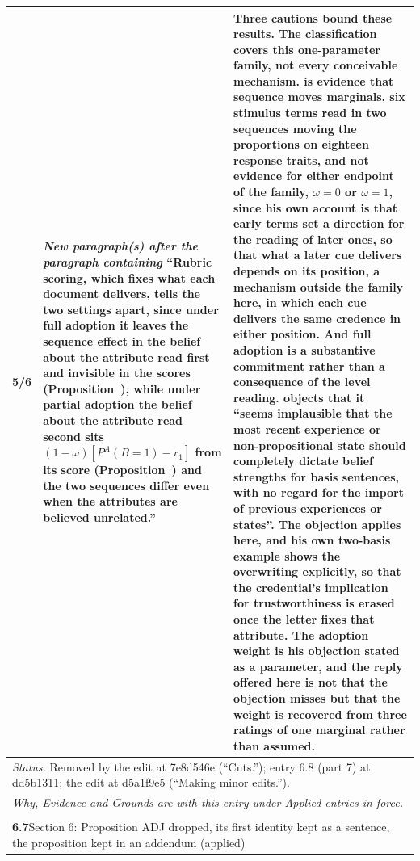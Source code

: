 \documentclass[10pt]{article}
\theoremstyle{definition}
\renewcommand{\ref}[1]{\textsc{\detokenize{#1}}}
\newlength{\fullw}\setlength{\fullw}{25.9cm}
\newcommand{\entryhead}[2]{\multicolumn{3}{|l|}{\rule{0pt}{2.6ex}\large\textbf{#1}\quad #2} \\ \hline}
\begin{document}
{\begin{longtable}{|p{0.9cm}|p{12.2cm}|p{12.2cm}|}
5/6 & \textit{New paragraph(s) after the paragraph containing} ``Rubric scoring, which fixes what each document delivers, tells the two settings apart, since under full adoption it leaves the sequence effect in the belief about the attribute read first and invisible in the scores (Proposition~\ref{prop:DRF}), while under partial adoption the belief about the attribute read second sits $(1-\omega)[P^{A}(B{=}1)-r_1]$ from its score (Proposition~\ref{prop:ADJ}) and the two sequences differ even when the attributes are believed unrelated.'' & Three cautions bound these results. The classification covers this one-parameter family, not every conceivable mechanism. \citet{Asch1946} is evidence that sequence moves marginals, six stimulus terms read in two sequences moving the proportions on eighteen response traits, and not evidence for either endpoint of the family, $\omega=0$ or $\omega=1$, since his own account is that early terms set a direction for the reading of later ones, so that what a later cue delivers depends on its position, a mechanism outside the family here, in which each cue delivers the same credence in either position. And full adoption is a substantive commitment rather than a consequence of the level reading. \citet{Hawthorne2004} objects that it ``seems implausible that the most recent experience or non-propositional state should completely dictate belief strengths for basis sentences, with no regard for the import of previous experiences or states''. The objection applies here, and his own two-basis example shows the overwriting explicitly, so that the credential's implication for trustworthiness is erased once the letter fixes that attribute. The adoption weight is his objection stated as a parameter, and the reply offered here is not that the objection misses but that the weight is recovered from three ratings of one marginal rather than assumed. \\ \hline
\multicolumn{3}{|p{\fullw}|}{\textit{Status.} Removed by the edit at 7e8d546e (``Cuts.''); entry 6.8 (part 7) at dd5b1311; the edit at d5a1f9e5 (``Making minor edits.'').} \\ \hline
\multicolumn{3}{|p{\fullw}|}{\textit{Why, Evidence and Grounds are with this entry under Applied entries in force.}} \\ \hline
\multicolumn{3}{|l|}{} \\ \hline
\entryhead{6.7}{Section 6: Proposition ADJ dropped, its first identity kept as a sentence, the proposition kept in an addendum (applied)\quad{\footnotesize\textit{(formerly C.24)}}}

\end{longtable}}
\end{document}
